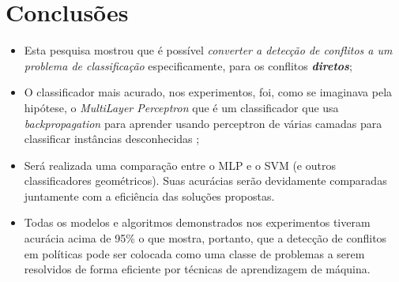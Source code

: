 \chapter{Conclusões}\label{conclusoes}
\begin{itemize}
	\item Esta pesquisa mostrou que é possível \textit{converter a detecção de conflitos a um problema de classificação} especificamente, para os conflitos \textbf{\textit{diretos}};
	\item O classificador mais acurado, nos experimentos, foi, como se imaginava pela hipótese, o \textit{MultiLayer Perceptron} que é um classificador que usa \textit{backpropagation} para aprender usando perceptron de várias camadas para classificar instâncias desconhecidas \cite{eibe2016};
	\item Será realizada uma comparação entre o MLP e o SVM (e outros classificadores geométricos). Suas acurácias serão devidamente comparadas juntamente com a eficiência das soluções propostas.
	\item Todas os modelos e algoritmos demonstrados nos experimentos tiveram acurácia acima de 95\% o que mostra, portanto, que a detecção de conflitos em políticas pode ser colocada como uma classe de problemas a serem resolvidos de forma eficiente por técnicas de aprendizagem de máquina.
\end{itemize}